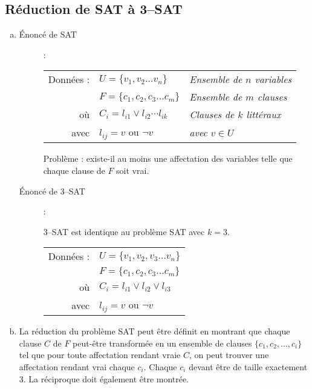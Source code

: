 \subsection{Réduction de SAT à 3--SAT}
\begin{enumerate}[(a)]
\item \begin{description}
\item[Énoncé de SAT] : \\
\begin{tabular}{r l l}
Données : & $ U = \lbrace v_1, v_2 \ldots v_n \rbrace $ & \emph{Ensemble de $n$ variables}\\
& $ F = \lbrace c_1, c_2, c_3 \ldots c_m \rbrace $ & \emph{Ensemble de $m$ clauses}\\
où & $ C_i = l_{i1} \vee l_{i2} \cdots l_{ik} $ & \emph{Clauses de $k$ littéraux}\\
avec & $ l_{ij} = v$ ou $ \neg v $ & \emph{avec $v \in U$} \\
\end{tabular}

Problème : existe-il au moins une affectation des variables telle que chaque clause de $F$ soit vrai.

\item [Énoncé de 3--SAT] : 

3--SAT est identique au problème SAT avec $k = 3$.\\
\begin{tabular}{r l}
Données : & $ U = \lbrace v_1, v_2, v_3 \ldots v_n \rbrace $\\
& $ F = \lbrace c_1, c_2, c_3 \ldots c_m \rbrace $\\
où & $ C_i = l_{i1} \vee l_{i2} \vee l_{i3} $\\
avec & $ l_{ij} = v$ ou $ \neg v$\\
\end{tabular}
\end{description}
\item La réduction du problème SAT peut être définit en montrant que chaque clause $C$ de $F$ peut-être transformée en un ensemble de clauses $\lbrace c_1, c_2, \ldots, c_i \rbrace$ tel que pour toute affectation rendant vraie $C$, on peut trouver une affectation rendant vrai chaque $c_i$. Chaque $c_i$ devant être de taille exactement 3. La réciproque doit également être montrée.

\end{enumerate}
